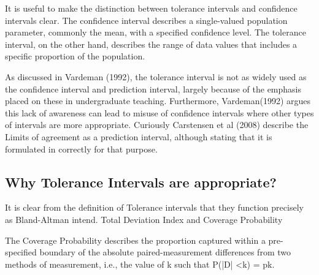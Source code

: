 \documentclass[Main.tex]{subfiles}
\begin{document}
	It is useful to make the distinction between tolerance intervals and confidence intervals clear. The confidence interval describes a single-valued population parameter, commonly the mean, with a specified confidence level. The tolerance interval, on the other hand, describes the range of data values that includes a specific proportion of the population.
	
	As discussed in Vardeman (1992), the tolerance interval is not as widely used as the confidence interval and prediction interval, largely because of the emphasis placed on these in undergraduate teaching. Furthermore, Vardeman(1992) argues this lack of awareness can lead to misuse of confidence intervals where other types of intervals are more appropriate.
	Curiously Carstensen et al (2008) describe the Limits of agreement as a prediction interval, although stating that it is formulated in correctly for that purpose.
	
	\subsection*{Why Tolerance Intervals are appropriate?}
	It is clear from the definition of Tolerance intervals that they function precisely as Bland-Altman intend.
	Total Deviation Index and Coverage Probability
	
	The Coverage Probability describes the proportion captured within a pre-specified boundary of the absolute paired-measurement differences from two methods of measurement, i.e., the value of k such that P(|D| <k) = pk.





















\end{document}
